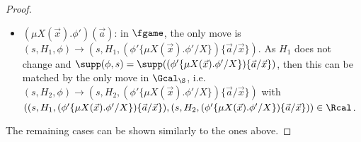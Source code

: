\begin{proof}
\begin{itemize}
\begin{itemize}
\begin{align*}
                (H_1 \cup \{\vec a\}) \cap \supp(s', \phi') &= ((H_1\setminus\{\vec a\}) \cap \supp(s', \phi')) \cup (\{\vec a\} \cap \supp(s', \phi'))
                \\
                &\subseteq (H_2 \cap \supp(s', \phi')) \cup (\{\vec a\} \cap \supp(s', \phi'))\subseteq H_2' 
            \end{align*}
            Thus, the move can be matched by $(s, H_1, \phi) \rightarrow (s', H_1', \phi')$ with $H_1' = H_1 \cup \{\vec a\}$ and $((s', H_1', \phi'),(s',H_2',\phi')) \in \Rcal$.
        \end{itemize}
        \item $(\mu X(\vec x).\phi')(\vec a)$: in $\fgame$, the only move is $(s, H_1, \phi) \rightarrow (s, H_1, (\phi'\{\mu X(\vec x).\phi'/X\})\{\vec a/\vec x\})$. As $H_1$ does not change and $\supp(\phi, s) = \supp((\phi'\{\mu X(\vec x).\phi'/X\})\{\vec a/\vec x\})$, then this can be matched by the only move in $\Gcal_\S$, i.e.\ $(s, H_2, \phi) \rightarrow (s, H_2, (\phi'\{\mu X(\vec x).\phi'/X\})\{\vec a/\vec x\})$ with $((s, H_1, (\phi'\{\mu X(\vec x).\phi'/X\})\{\vec a/\vec x\}), (s, H_2, (\phi'\{\mu X(\vec x).\phi'/X\})\{\vec a/\vec x\})) \in \Rcal$. 
    \end{itemize} 
The remaining cases can be shown similarly to the ones above.
  \end{proof}

